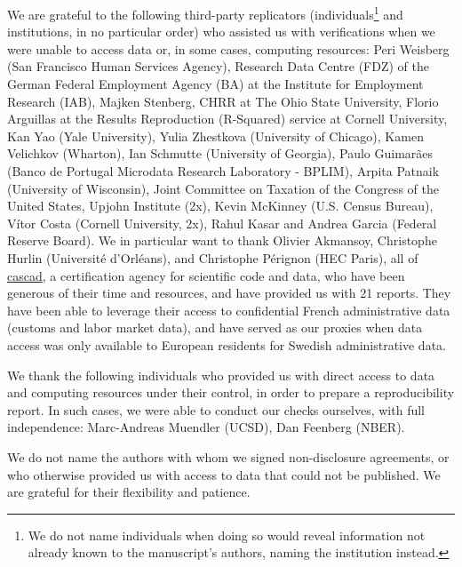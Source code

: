 \documentclass[PP]{AEA}
\begin{document}
We are grateful to the following third-party replicators (individuals\footnote{We do not name individuals when doing so would reveal information not already known to the manuscript's authors, naming the institution instead.} and institutions, in no particular order) who assisted us with verifications when we were unable to access data or, in some cases, computing resources:
%
Peri Weisberg (San Francisco Human Services Agency), Research Data Centre (FDZ) of the German Federal Employment Agency (BA) at the Institute for Employment Research (IAB), Majken Stenberg, CHRR at The Ohio State University, Florio Arguillas at the Results Reproduction (R-Squared) service at Cornell University, Kan Yao (Yale University),  Yulia Zhestkova (University of Chicago), Kamen Velichkov (Wharton), Ian Schmutte (University of Georgia), Paulo Guimarães (Banco de Portugal Microdata Research Laboratory - BPLIM), Arpita Patnaik (University of Wisconsin), Joint Committee on Taxation of the Congress of the United States, Upjohn Institute (2x), Kevin McKinney (U.S. Census Bureau), Vítor Costa (Cornell University, 2x), Rahul Kasar and Andrea Garcia (Federal Reserve Board). We in particular want to thank Olivier Akmansoy, Christophe Hurlin (Université d'Orléans), and Christophe Pérignon (HEC Paris), all of \href{https://cascad.tech}{cascad}, a certification agency for scientific code and data, who have been generous of their time and resources, and have provided us with 21 reports. They have been able to leverage their access to confidential French administrative data (customs and labor market data), and have served as our proxies when data access was only available to European residents for Swedish administrative data. 

We thank the following individuals who provided us with direct access to data and computing resources under their control, in order to prepare a reproducibility report. In such cases, we were able to conduct our checks ourselves, with full independence: Marc-Andreas Muendler (UCSD), Dan Feenberg (NBER).

We do not name the authors with whom we signed non-disclosure agreements, or who otherwise provided us with access to data that could not be published. We are grateful for their flexibility and patience.
\end{document}

